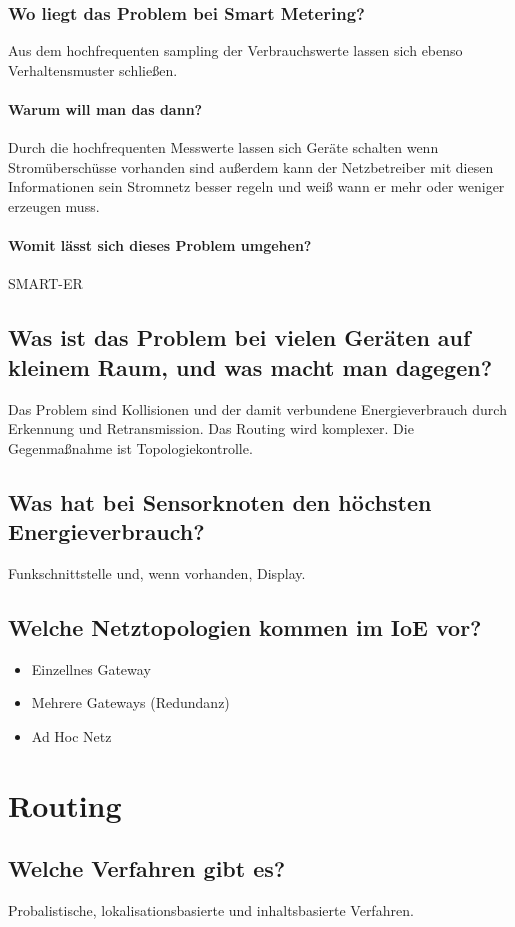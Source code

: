 	\subsubsection{Wo liegt das Problem bei Smart Metering?}
	Aus dem hochfrequenten sampling der Verbrauchswerte lassen sich ebenso Verhaltensmuster schließen.
	\paragraph{Warum will man das dann?}
		Durch die hochfrequenten Messwerte lassen sich Geräte schalten wenn Stromüberschüsse vorhanden sind außerdem kann der Netzbetreiber mit diesen Informationen sein Stromnetz besser regeln und weiß wann er mehr oder weniger erzeugen muss.
	\paragraph{Womit lässt sich dieses Problem umgehen?}
		SMART-ER
	\subsection{Was ist das Problem bei vielen Geräten auf kleinem Raum, und was macht man dagegen?}
	Das Problem sind Kollisionen und der damit verbundene Energieverbrauch durch Erkennung und Retransmission. Das Routing wird komplexer. Die Gegenmaßnahme ist Topologiekontrolle.
	
	\subsection{Was hat bei Sensorknoten den höchsten Energieverbrauch?}
	Funkschnittstelle und, wenn vorhanden, Display.
	
	\subsection{Welche Netztopologien kommen im IoE vor?}
	\begin{itemize}
		\item Einzellnes Gateway
		\item Mehrere Gateways (Redundanz)
		\item Ad\- Hoc\- Netz
	\end{itemize}
		
\section{Routing}
	\subsection{Welche Verfahren gibt es?}
		Probalistische, lokalisationsbasierte und inhaltsbasierte Verfahren.
		

